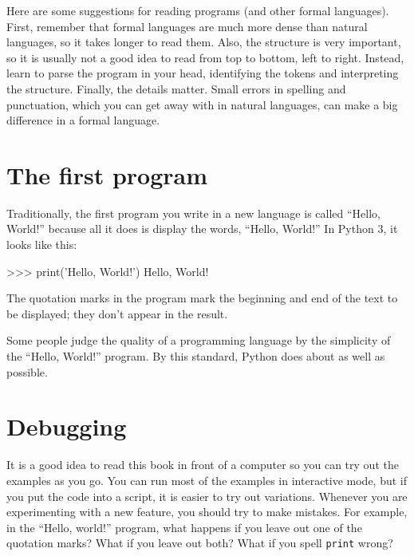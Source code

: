 Here are some suggestions for reading programs (and other formal
languages).  First, remember that formal languages are much more dense
than natural languages, so it takes longer to read them.  Also, the
structure is very important, so it is usually not a good idea to read
from top to bottom, left to right.  Instead, learn to parse the
program in your head, identifying the tokens and interpreting the
structure.  Finally, the details matter.  Small errors in
spelling and punctuation, which you can get away
with in natural languages, can make a big difference in a formal
language.

\section{The first program}
\label{hello}


Traditionally, the first program you write in a new language
is called ``Hello, World!'' because all it does is display the
words, ``Hello, World!''  In Python 3, it looks like this:

\beforeverb
\begin{pyinterpreter}
>>> print('Hello, World!')
Hello, World!
\end{pyinterpreter}
\afterverb
%

The quotation marks in the program mark the beginning and end
of the text to be displayed; they don't appear in the result.


Some people judge the quality of a programming language by the
simplicity of the ``Hello, World!'' program.  By this standard, Python
does about as well as possible.


\section{Debugging}

It is a good idea to read this book in front of a computer so you can
try out the examples as you go.  You can run most of the examples in
interactive mode, but if you put the code into a script, it is easier
to try out variations.
Whenever you are experimenting with a new feature, you should try
to make mistakes.  For example, in the ``Hello, world!'' program,
what happens if you leave out one of the quotation marks?  What
if you leave out both?  What if you spell {\tt print} wrong?

